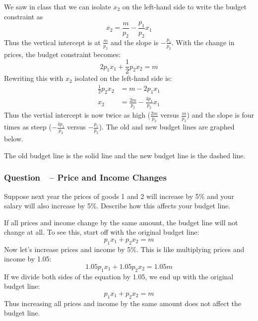 \documentclass[12pt]{article}
\newcounter{question}[section]
\newcommand{\question}[1]{\refstepcounter{question}
  \subsubsection*{Question~\thequestion~-- #1}}
\begin{document}
\textcolor{solution-color}{
  We saw in class that we can isolate $x_2$ on the left-hand side to write the
  budget constraint as
  \[
    x_2 =\frac{m}{p_2} - \frac{p_1}{p_2}x_1
  \]
  Thus the vertical intercept is at $\frac{m}{p_2}$ and the slope is
  $-\frac{p_1}{p_2}$. With the change in prices, the budget constraint becomes:
  \[
    2p_1x_1 + \frac{1}{2}p_2x_2 =m
  \]
  Rewriting this with $x_2$ isolated on the left-hand side is:
  \begin{align*}
    \frac{1}{2}p_2 x_2 &= m - 2p_1x_1\\
    x_2 &= \frac{2m}{p_2} - \frac{4p_1}{p_2}x_1
  \end{align*}
  Thus the vertial intercept is now twice as high ($\frac{2m}{p_2}$ versus
  $\frac{m}{p_2}$) and the slope is four times as steep ($-\frac{4p_1}{p_2}$ versus
  $-\frac{p_1}{p_2}$).
  The old and new budget lines are graphed below.
  \begin{center}
  \end{center}
  The old budget line is the solid line and the new budget line is the dashed
  line.
}

\question{Price and Income Changes}
Suppose next year the prices of goods 1 and 2 will
increase by 5\% and your salary will also increase by 5\%. Describe how this
affects your budget line.

\textcolor{solution-color}{
  If all prices and income change by the same amount, the budget line will not
  change at all. To see this, start off with the original budget line:
  \[
    p_1x_1 + p_2x_2 =m
  \]
  Now let's increase prices and income by 5\%. This is like multiplying prices
  and income by 1.05:
  \[
    1.05 p_1x_1 + 1.05 p_2x_2 =1.05 m
  \]
  If we divide both sides of the equation by 1.05, we end up with the original
  budget line:
  \[
    p_1x_1 + p_2x_2 =m
  \]
  Thus increasing all prices and income by the same amount does not affect the
  budget line.
}
\end{document}
